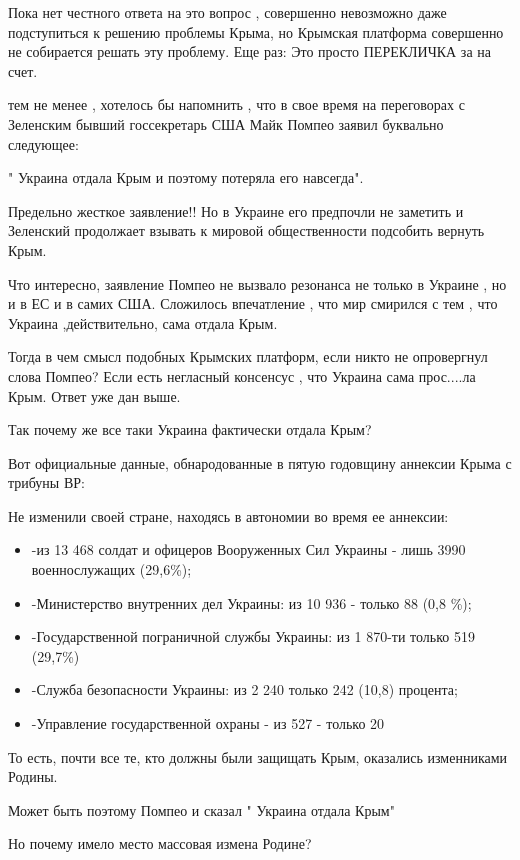 Пока нет честного ответа на это вопрос , совершенно невозможно  даже
подступиться к решению проблемы Крыма, но Крымская платформа совершенно не
собирается решать эту проблему.   Еще раз: Это просто ПЕРЕКЛИЧКА за на счет.

 тем не менее , хотелось бы напомнить , что в свое время   на  переговорах  с
 Зеленским   бывший госсекретарь США Майк Помпео заявил буквально следующее:

 " Украина отдала Крым и  поэтому потеряла  его навсегда". 

Предельно жесткое заявление!!   Но в   Украине   его  предпочли не заметить и
Зеленский продолжает   взывать к мировой общественности  подсобить вернуть
Крым.

Что интересно, заявление Помпео не вызвало резонанса  не только в Украине , но
и  в ЕС и в самих США. Сложилось впечатление , что мир смирился с тем , что
Украина ,действительно,  сама отдала Крым.

Тогда в чем смысл подобных Крымских платформ, если никто не опровергнул слова
Помпео?   Если есть негласный  консенсус , что Украина сама прос....ла Крым.
Ответ уже дан выше.

Так почему  же все таки Украина  фактически отдала Крым?  

Вот официальные данные, обнародованные  в пятую годовщину аннексии Крыма с трибуны ВР:

Не изменили своей стране, находясь в автономии во время ее аннексии: 

\begin{itemize}
  \item -из 13 468 солдат и офицеров Вооруженных Сил Украины - лишь 3990 военнослужащих (29,6\%); 
  \item -Министерство внутренних дел Украины: из 10 936 - только 88 (0,8 \%);
  \item -Государственной пограничной службы Украины: из 1 870-ти только 519 (29,7\%)
  \item -Служба безопасности Украины: из 2 240 только 242 (10,8) процента; 
  \item -Управление государственной охраны - из 527 - только 20 
\end{itemize}

То есть, почти все те, кто должны были защищать Крым, оказались изменниками Родины.

Может быть  поэтому Помпео и сказал  " Украина отдала Крым"

Но почему имело место массовая измена Родине?  

